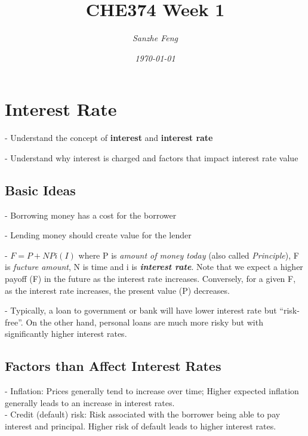 \documentclass{article}
\begin{document}
\begin{titlepage}
	

\title{\textbf{CHE374 Week 1}}
\author{\textit{Sanzhe Feng}}
\date{\textit{\today}}
\maketitle
\end{titlepage}
\setlength{\parindent}{0pt}

\section*{Interest Rate}
- Understand the concept of \textbf{interest} and \textbf{interest rate}

- Understand why interest is charged and factors that impact interest rate value

\subsection*{Basic Ideas}

- Borrowing money has a cost for the borrower

- Lending money should create value for the lender

- $F = P + NPi (I)$ where P is \emph{amount of money today} (also called \textit{Principle}), F is \emph{fucture amount}, N is time and i is \emph{\textbf{interest rate}}.
Note that we expect a higher payoff (F) in the future as the interest rate increases. Conversely, for a given F, as the interest rate increases,
the present value (P) decreases.

- Typically, a loan to government or bank will have lower interest rate but ``risk-free''. On the other hand, 
personal loans are much more risky but with significantly higher interest rates.

\subsection*{Factors than Affect Interest Rates}

- Inflation: Prices generally tend to increase over time; Higher expected inflation generally leads to an increase in interest rates.\\

- Credit (default) risk: Risk associated with the borrower being able to pay interest and principal. Higher risk of default leads to higher interest rates.\\
\end{document}
